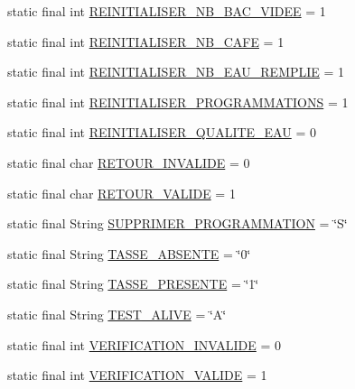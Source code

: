 \begin{DoxyCompactItemize}
\item 
static final int \hyperlink{classcom_1_1example_1_1ekawa_1_1_protocole_a534fcc2db3caed0e7e6f969edde12f4d}{R\+E\+I\+N\+I\+T\+I\+A\+L\+I\+S\+E\+R\+\_\+\+N\+B\+\_\+\+B\+A\+C\+\_\+\+V\+I\+D\+EE} = 1
\item 
static final int \hyperlink{classcom_1_1example_1_1ekawa_1_1_protocole_ab93072e61ae443c91f07700a3f754a1c}{R\+E\+I\+N\+I\+T\+I\+A\+L\+I\+S\+E\+R\+\_\+\+N\+B\+\_\+\+C\+A\+FE} = 1
\item 
static final int \hyperlink{classcom_1_1example_1_1ekawa_1_1_protocole_a627d052e923e3445296c0ea539ebc018}{R\+E\+I\+N\+I\+T\+I\+A\+L\+I\+S\+E\+R\+\_\+\+N\+B\+\_\+\+E\+A\+U\+\_\+\+R\+E\+M\+P\+L\+IE} = 1
\item 
static final int \hyperlink{classcom_1_1example_1_1ekawa_1_1_protocole_a2586e1d3430677cd425f4a462819c10c}{R\+E\+I\+N\+I\+T\+I\+A\+L\+I\+S\+E\+R\+\_\+\+P\+R\+O\+G\+R\+A\+M\+M\+A\+T\+I\+O\+NS} = 1
\item 
static final int \hyperlink{classcom_1_1example_1_1ekawa_1_1_protocole_a201cf97045945715a64c2b055e9a59c3}{R\+E\+I\+N\+I\+T\+I\+A\+L\+I\+S\+E\+R\+\_\+\+Q\+U\+A\+L\+I\+T\+E\+\_\+\+E\+AU} = 0
\item 
static final char \hyperlink{classcom_1_1example_1_1ekawa_1_1_protocole_ae7fcfc428ba9d1815daf59fcab12da13}{R\+E\+T\+O\+U\+R\+\_\+\+I\+N\+V\+A\+L\+I\+DE} = \textquotesingle{}0\textquotesingle{}
\item 
static final char \hyperlink{classcom_1_1example_1_1ekawa_1_1_protocole_aa9b59014b7359878297b002afa160a46}{R\+E\+T\+O\+U\+R\+\_\+\+V\+A\+L\+I\+DE} = \textquotesingle{}1\textquotesingle{}
\item 
static final String \hyperlink{classcom_1_1example_1_1ekawa_1_1_protocole_ad05ba92eb443c22bdcd6d7a5a6928558}{S\+U\+P\+P\+R\+I\+M\+E\+R\+\_\+\+P\+R\+O\+G\+R\+A\+M\+M\+A\+T\+I\+ON} = \char`\"{}S\char`\"{}
\item 
static final String \hyperlink{classcom_1_1example_1_1ekawa_1_1_protocole_aec2265bfb60660cbf5dfb716f694bcfb}{T\+A\+S\+S\+E\+\_\+\+A\+B\+S\+E\+N\+TE} = \char`\"{}0\char`\"{}
\item 
static final String \hyperlink{classcom_1_1example_1_1ekawa_1_1_protocole_a2f969365d74ec301bc9d76fb992ed9e6}{T\+A\+S\+S\+E\+\_\+\+P\+R\+E\+S\+E\+N\+TE} = \char`\"{}1\char`\"{}
\item 
static final String \hyperlink{classcom_1_1example_1_1ekawa_1_1_protocole_a710b865b4ce664d2adda2f5d5ccd6a72}{T\+E\+S\+T\+\_\+\+A\+L\+I\+VE} = \char`\"{}A\char`\"{}
\item 
static final int \hyperlink{classcom_1_1example_1_1ekawa_1_1_protocole_a85fcaa3a9fda1a44914a52d0c2f79ed9}{V\+E\+R\+I\+F\+I\+C\+A\+T\+I\+O\+N\+\_\+\+I\+N\+V\+A\+L\+I\+DE} = 0
\item 
static final int \hyperlink{classcom_1_1example_1_1ekawa_1_1_protocole_a9a84f1d8388a25297e50fbc3d293ecf3}{V\+E\+R\+I\+F\+I\+C\+A\+T\+I\+O\+N\+\_\+\+V\+A\+L\+I\+DE} = 1
\end{DoxyCompactItemize}
